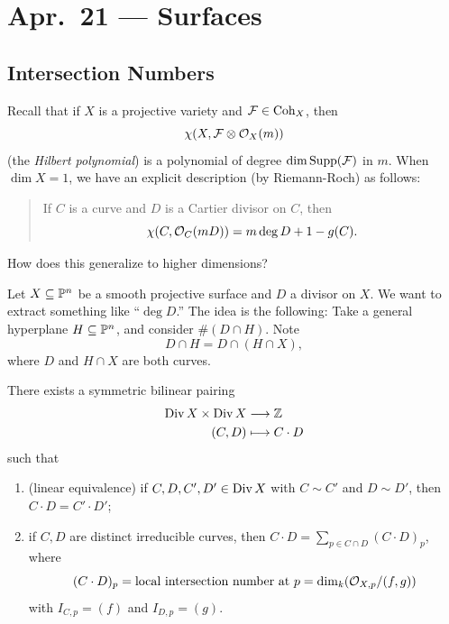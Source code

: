 \chapter{Apr.~21 --- Surfaces}

\section{Intersection Numbers}

\begin{remark}
  Recall that if $X$ is a projective
  variety and $\mathcal{F} \in \operatorname{Coh}_X$,
  then
  \[
    \chi(X, \mathcal{F} \otimes \mathcal{O}_X(m))
  \]
  (the \emph{Hilbert polynomial})
  is a polynomial of degree $\dim \operatorname{Supp}(\mathcal{F})$
  in $m$.
  When $\dim X = 1$, we have an explicit
  description (by Riemann-Roch) as follows:
  \begin{quote}
    \vspace{-2em}
    \begin{theorem}
      If $C$ is a curve and $D$ is a
      Cartier divisor on $C$, then
      \[
        \chi(C, \mathcal{O}_C(mD))
        = m \deg D + 1 - g(C).
      \]
    \end{theorem}
  \end{quote}
  How does this generalize to higher
  dimensions?

  Let $X \subseteq \mathbb{P}^n$ be a smooth
  projective surface and $D$ a divisor on
  $X$. We want to extract something like
  ``$\deg D$.'' The idea is the following:
  Take a general hyperplane 
  $H \subseteq \mathbb{P}^n$, and consider
  $\#(D \cap H)$. Note
  \[
    D \cap H
    = D \cap (H \cap X),
  \]
  where $D$ and $H \cap X$ are both curves.
\end{remark}

\begin{theorem}
  There exists a symmetric bilinear pairing
  \begin{align*}
    \operatorname{Div} X \times \operatorname{Div} X
    &\longrightarrow \mathbb{Z} \\
    (C, D) &\longmapsto C \cdot D
  \end{align*}
  such that
  \begin{enumerate}
    \item (linear equivalence) if
      $C, D, C', D' \in \operatorname{Div} X$ with
      $C \sim C'$ and $D \sim D'$, then
      $C \cdot D = C' \cdot D'$;
    \item if $C, D$ are distinct irreducible
      curves, then
      $C \cdot D = \sum_{p \in C \cap D} (C \cdot D)_p$,
      where
      \[
        (C \cdot D)_p
        = \text{local intersection number at $p$}
        = \dim_k (\mathcal{O}_{X, p} / (f, g))
      \]
      with $I_{C, p} = (f)$ and
      $I_{D, p} = (g)$.
  \end{enumerate}
\end{theorem}

